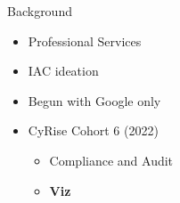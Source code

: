 \begin{frame}{Background}

  \begin{itemize}
    \item Professional Services
    \item IAC ideation
    \item Begun with Google only
    \item CyRise Cohort 6 (2022)
      \begin{itemize}
        \item Compliance and Audit
        \item \textbf{Viz}
      \end{itemize}
  \end{itemize}


\end{frame}
